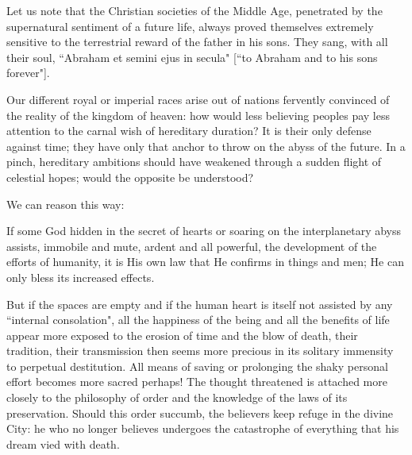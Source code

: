 Let us note that the Christian societies of the Middle Age, penetrated by the supernatural sentiment of a future life, always proved themselves extremely sensitive to the terrestrial reward of the father in his sons. They sang, with all their soul, ``Abraham et semini ejus in secula" [``to Abraham and to his sons forever"].

Our different royal or imperial races arise out of nations fervently convinced of the reality of the kingdom of heaven: how would less believing peoples pay less attention to the carnal wish of hereditary duration? It is their only defense against time; they have only that anchor to throw on the abyss of the future. In a pinch, hereditary ambitions should have weakened through a sudden flight of celestial hopes; would the opposite be understood?

We can reason this way:

If some God hidden in the secret of hearts or soaring on the interplanetary abyss assists, immobile and mute, ardent and all powerful, the development of the efforts of humanity, it is His own law that He confirms in things and men; He can only bless its increased effects.

But if the spaces are empty and if the human heart is itself not assisted by any ``internal consolation", all the happiness of the being and all the benefits of life appear more exposed to the erosion of time and the blow of death, their tradition, their transmission then seems more precious in its solitary immensity to perpetual destitution. All means of saving or prolonging the shaky personal effort becomes more sacred perhaps! The thought threatened is attached more closely to the philosophy of order and the knowledge of the laws of its preservation. Should this order succumb, the believers keep refuge in the divine City: he who no longer believes undergoes the catastrophe of everything that his dream vied with death.



